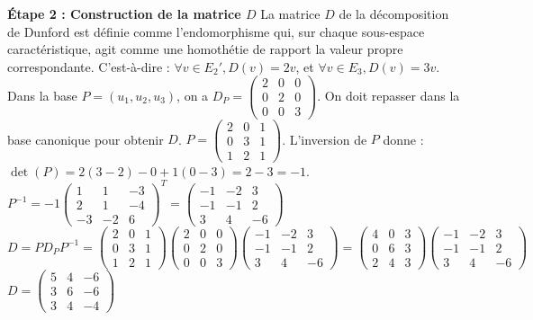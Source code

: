 \documentclass[11pt,a4paper]{article}
\begin{document}
\textbf{Étape 2 : Construction de la matrice $D$}
La matrice $D$ de la décomposition de Dunford est définie comme l'endomorphisme qui, sur chaque sous-espace caractéristique, agit comme une homothétie de rapport la valeur propre correspondante.
C'est-à-dire : $\forall v \in E_2', D(v) = 2v$, et $\forall v \in E_3, D(v) = 3v$.
Dans la base $P = (u_1, u_2, u_3)$, on a $D_P = \begin{pmatrix} 2 & 0 & 0 \\ 0 & 2 & 0 \\ 0 & 0 & 3 \end{pmatrix}$.
On doit repasser dans la base canonique pour obtenir $D$.
$P = \begin{pmatrix} 2 & 0 & 1 \\ 0 & 3 & 1 \\ 1 & 2 & 1 \end{pmatrix}$. L'inversion de $P$ donne : $\det(P) = 2(3-2) - 0 + 1(0-3) = 2 - 3 = -1$.
$P^{-1} = -1 \begin{pmatrix} 1 & 1 & -3 \\ 2 & 1 & -4 \\ -3 & -2 & 6 \end{pmatrix}^T = \begin{pmatrix} -1 & -2 & 3 \\ -1 & -1 & 2 \\ 3 & 4 & -6 \end{pmatrix}$
$D = P D_P P^{-1} = \begin{pmatrix} 2 & 0 & 1 \\ 0 & 3 & 1 \\ 1 & 2 & 1 \end{pmatrix} \begin{pmatrix} 2 & 0 & 0 \\ 0 & 2 & 0 \\ 0 & 0 & 3 \end{pmatrix} \begin{pmatrix} -1 & -2 & 3 \\ -1 & -1 & 2 \\ 3 & 4 & -6 \end{pmatrix} = \begin{pmatrix} 4 & 0 & 3 \\ 0 & 6 & 3 \\ 2 & 4 & 3 \end{pmatrix} \begin{pmatrix} -1 & -2 & 3 \\ -1 & -1 & 2 \\ 3 & 4 & -6 \end{pmatrix}$
$D = \begin{pmatrix} 5 & 4 & -6 \\ 3 & 6 & -6 \\ 3 & 4 & -4 \end{pmatrix}$
\end{document}
